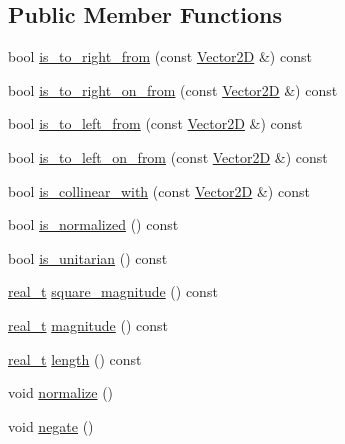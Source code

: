 \subsection*{Public Member Functions}
\begin{DoxyCompactItemize}
\item 
bool \hyperlink{class_designar_1_1_vector2_d_aaf996e3b7ab3c95749a7c047a9e93d58}{is\+\_\+to\+\_\+right\+\_\+from} (const \hyperlink{class_designar_1_1_vector2_d}{Vector2D} \&) const
\item 
bool \hyperlink{class_designar_1_1_vector2_d_ae3db7e1f1be95eb1cfb3647fa181bb9a}{is\+\_\+to\+\_\+right\+\_\+on\+\_\+from} (const \hyperlink{class_designar_1_1_vector2_d}{Vector2D} \&) const
\item 
bool \hyperlink{class_designar_1_1_vector2_d_a5926133a159fe438adb61f7231443aec}{is\+\_\+to\+\_\+left\+\_\+from} (const \hyperlink{class_designar_1_1_vector2_d}{Vector2D} \&) const
\item 
bool \hyperlink{class_designar_1_1_vector2_d_a90c14cf337fa288a68d5884716de125e}{is\+\_\+to\+\_\+left\+\_\+on\+\_\+from} (const \hyperlink{class_designar_1_1_vector2_d}{Vector2D} \&) const
\item 
bool \hyperlink{class_designar_1_1_vector2_d_a70660ef72aa64cf53c66dd15717680f5}{is\+\_\+collinear\+\_\+with} (const \hyperlink{class_designar_1_1_vector2_d}{Vector2D} \&) const
\item 
bool \hyperlink{class_designar_1_1_vector2_d_ace8e5848fe3eb87532827c7ffdef38fd}{is\+\_\+normalized} () const
\item 
bool \hyperlink{class_designar_1_1_vector2_d_af33b3e2db984c1e79ae87b17bca170dc}{is\+\_\+unitarian} () const
\item 
\hyperlink{namespace_designar_aca2c32af26808dbec1f3a3071fad25ce}{real\+\_\+t} \hyperlink{class_designar_1_1_vector2_d_a2a95d3767f9c5bde2d8a3e6c8074ff7a}{square\+\_\+magnitude} () const
\item 
\hyperlink{namespace_designar_aca2c32af26808dbec1f3a3071fad25ce}{real\+\_\+t} \hyperlink{class_designar_1_1_vector2_d_aa412a05af3021e3b1d942921aa6a15d0}{magnitude} () const
\item 
\hyperlink{namespace_designar_aca2c32af26808dbec1f3a3071fad25ce}{real\+\_\+t} \hyperlink{class_designar_1_1_vector2_d_a3bfec04055e111cf81be2e3244cb7125}{length} () const
\item 
void \hyperlink{class_designar_1_1_vector2_d_ac504a8cec82e7183bd0105e83942fd67}{normalize} ()
\item 
void \hyperlink{class_designar_1_1_vector2_d_a209bedef7a754a768fc3be0e8b97d2b8}{negate} ()

\end{DoxyCompactItemize}
